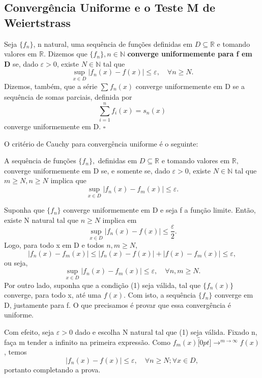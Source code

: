 \documentclass[../analysis_notes.tex]{subfiles}
\begin{document}
\subsection{Convergência Uniforme e o Teste M de Weiertstrass}
\begin{def*}
	Seja \(\{f_{n}\}\), n natural, uma sequência de funções definidas em \(D\subseteq \mathbb{R}\) e tomando valores em \(\mathbb{R}.\) Dizemos que \(\{f_{n}\}, n\in \mathbb{N}\) \textbf{converge uniformemente para f em D} se, dado \(\varepsilon > 0\), existe \(N\in \mathbb{N}\) tal que
	\[
		\sup_{x\in D}|f_{n}(x)-f(x)|\leq \varepsilon , \quad \forall n\geq N.
	\]
	Dizemos, também, que a série \(\sum\limits_{}^{}f_{n}(x)\) converge uniformemente em D se a sequência de somas parciais, definida por
	\[
		\sum\limits_{i=1}^{n}f_{i}(x)=s_{n}(x)
	\]
	converge uniformemente em D. \(\square\)
\end{def*}
O critério de Cauchy para convergência uniforme é o seguinte:
\hypertarget{uniform_cauchy}{
	\begin{theorem*}
		A sequência de funções \(\{f_{n}\},\) definidas em \(D\subseteq \mathbb{R}\) e tomando valores em \(\mathbb{R},\) converge uniformemente em D se, e somente se, dado \(\varepsilon > 0\), existe \(N\in \mathbb{N}\) tal que \(m\geq N, n \geq N\) implica que
		\[
			\sup_{x\in D}|f_{n}(x)-f_{m}(x)|\leq \varepsilon .
		\]
	\end{theorem*}
}
\begin{proof*}
	Suponha que \(\{f_{n}\}\) converge uniformemente em D e seja f a função limite. Então, existe N natural tal que \(n\geq N\) implica em
	\[
		\sup_{x\in D}|f_{n}(x)-f(x)|\leq \frac{\varepsilon }{2}.
	\]
	Logo, para todo x em D e todos \(n, m \geq N\),
	\[
		|f_{n}(x)-f_{m}(x)|\leq |f_{n}(x)-f(x)|+|f(x)-f_{m}(x)|\leq \varepsilon,
	\]
	ou seja,
	\[
		\sup_{x\in D}|f_{n}(x)-f_{m}(x)|\leq \varepsilon , \quad \forall n, m\geq N.
	\]
	Por outro lado, suponha que a condição (1) seja válida, tal que \(\{f_{n}(x)\}\) converge, para todo x, até uma \(f(x)\). Com isto, a sequência \(\{f_{n}\}\) converge em D, justamente para f. O que precisamos é provar que essa convergência é uniforme.

	Com efeito, seja \(\varepsilon >0\) dado e escolha N natural tal que (1) seja válida. Fixado n, faça m tender a infinito na primeira expressão. Como \(f_{m}(x)\overbracket[0pt]{\longrightarrow}^{m\to \infty}f(x)\), temos
	\[
		|f_{n}(x)-f(x)|\leq \varepsilon , \quad \forall n\geq N; \forall x\in D,
	\]
	portanto completando a prova.\qedsymbol
\end{proof*}
\end{document}
